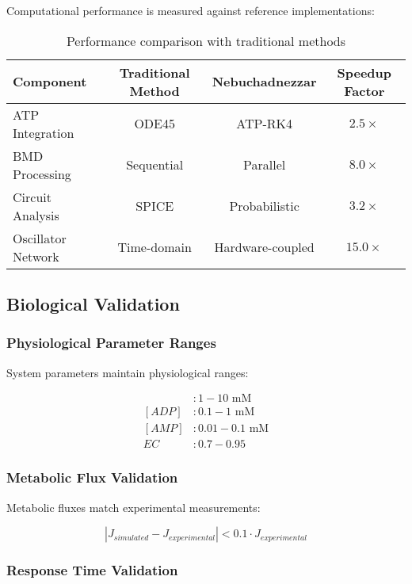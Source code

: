 \documentclass[12pt,a4paper]{article}
\begin{document}
Computational performance is measured against reference implementations:

\begin{table}[H]
\centering
\begin{tabular}{lccc}
\toprule
Component & Traditional Method & Nebuchadnezzar & Speedup Factor \\
\midrule
ATP Integration & ODE45 & ATP-RK4 & $2.5\times$ \\
BMD Processing & Sequential & Parallel & $8.0\times$ \\
Circuit Analysis & SPICE & Probabilistic & $3.2\times$ \\
Oscillator Network & Time-domain & Hardware-coupled & $15.0\times$ \\
\bottomrule
\end{tabular}
\caption{Performance comparison with traditional methods}
\end{table}

\subsection{Biological Validation}

\subsubsection{Physiological Parameter Ranges}

System parameters maintain physiological ranges:

\begin{align}
[ATP] &: 1-10 \text{ mM} \\
[ADP] &: 0.1-1 \text{ mM} \\
[AMP] &: 0.01-0.1 \text{ mM} \\
EC &: 0.7-0.95
\end{align}

\subsubsection{Metabolic Flux Validation}

Metabolic fluxes match experimental measurements:

\begin{equation}
|J_{simulated} - J_{experimental}| < 0.1 \cdot J_{experimental}
\end{equation}

\subsubsection{Response Time Validation}
\end{document}
